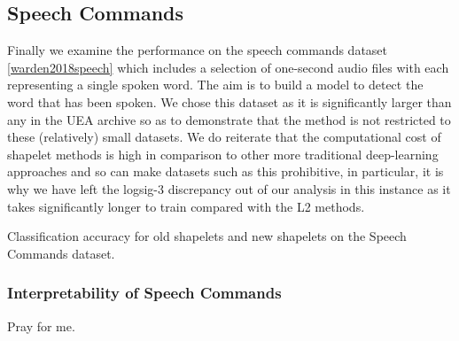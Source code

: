 \subsection{Speech Commands}
Finally we examine the performance on the speech commands dataset \ref{warden2018speech} which includes a selection of one-second audio files with each representing a single spoken word. The aim is to build a model to detect the word that has been spoken. We chose this dataset as it is significantly larger than any in the UEA archive so as to demonstrate that the method is not restricted to these (relatively) small datasets. We do reiterate that the computational cost of shapelet methods is high in comparison to other more traditional deep-learning approaches and so can make datasets such as this prohibitive, in particular, it is why we have left the logsig-3 discrepancy out of our analysis in this instance as it takes significantly longer to train compared with the L2 methods.
\begin{table}[ht]
    \caption{Classification accuracy for old shapelets and new shapelets on the Speech Commands dataset.}
    \label{tab:speech_commands}
    \centering
    
\end{table}

\subsubsection{Interpretability of Speech Commands}
Pray for me.

